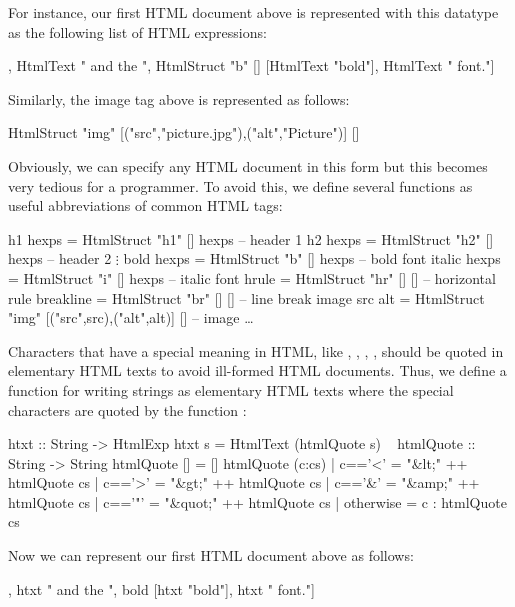 For instance, our first HTML document above is represented with this
datatype as the following list of HTML expressions:
%
\begin{prog}
[HtmlText "This is the ",
 HtmlStruct "i" [] [HtmlText "italic"],
 HtmlText " and the ",
 HtmlStruct "b" [] [HtmlText "bold"],
 HtmlText " font."]
\end{prog}
%
Similarly, the image tag above is represented as follows:
%
\begin{prog}
HtmlStruct "img" [("src","picture.jpg"),("alt","Picture")] []
\end{prog}
%
Obviously, we can specify any HTML document in this form
but this becomes very tedious for a programmer.
To avoid this, we define several functions as useful abbreviations
of common HTML tags:
%
\begin{prog}
h1     hexps  = HtmlStruct "h1" [] hexps                      -- header 1
h2     hexps  = HtmlStruct "h2" [] hexps                      -- header 2
$\vdots$
bold   hexps  = HtmlStruct "b"  [] hexps                      -- bold font
italic hexps  = HtmlStruct "i"  [] hexps                      -- italic font
hrule         = HtmlStruct "hr" [] []                         -- horizontal rule
breakline     = HtmlStruct "br" [] []                         -- line break
image src alt = HtmlStruct "img" [("src",src),("alt",alt)] [] -- image
\ldots
\end{prog}
%
%
%
Characters that have a special meaning in HTML,
like \ccode{<}, \ccode{>}, \ccode{\&}, ,
should be quoted in elementary HTML texts
to avoid ill-formed HTML documents. Thus, we define
a function  for writing strings as
elementary HTML texts where the special characters are quoted
by the function :
\begin{prog}
htxt   :: String -> HtmlExp
htxt s = HtmlText (htmlQuote s)
~
htmlQuote :: String -> String
htmlQuote [] = []
htmlQuote (c:cs) | c=='<' = "\&lt;"   ++ htmlQuote cs
                 | c=='>' = "\&gt;"   ++ htmlQuote cs
                 | c=='\&' = "\&amp;"  ++ htmlQuote cs
                 | c=='"' = "\&quot;" ++ htmlQuote cs
                 | otherwise = c : htmlQuote cs
\end{prog}
%
Now we can represent our first HTML document above as follows:
%
\begin{prog}
[htxt "This is the ", italic [htxt "italic"],
 htxt " and the ", bold [htxt "bold"], htxt " font."]
\end{prog}
